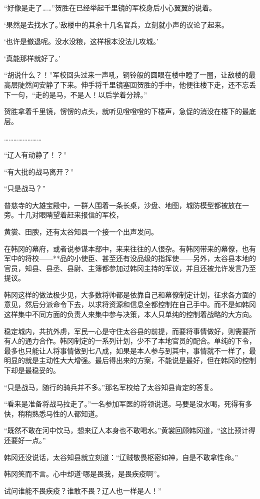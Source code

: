 “好像是走了……”贺胜在已经举起千里镜的军校身后小心翼翼的说着。

‘果然是去找水了。’敌楼中的其余十几名官兵，立刻就小声的议论了起来。

‘也许是撤退呢。没水没粮，这样根本没法儿攻城。’

‘真能那样就好了。’

“胡说什么？！”军校回头过来一声吼，铜铃般的圆眼在楼中瞪了一圈，让敌楼的最高层陡然间安静了下来。伸手将千里镜塞回贺胜的手中，他便往楼下走，还不忘丢下一句，“走的是马，不是人！以后学着分辨。”

贺胜拿着千里镜，愣愣的点头，就听见噔噔噔的下楼声，急促的消没在楼下的最底层。

……………………

“辽人有动静了！？”

“有大批的战马离开？”

“只是战马？”

普慈寺的大雄宝殿中，一群人围着一条长桌，沙盘、地图，城防模型都被放在一旁。十几对眼睛望着赶来报信的军校，

黄裳、田腴，还有太谷知县一个接一个出声发问。

在韩冈的幕府，或者说参谋本部中，来来往往的人很杂。有韩冈带来的幕僚，也有军中的将校——**品的小使臣、甚至还有没品级的指挥使——另外，太谷县本地的官员，知县、县丞、县尉、主簿都参加过韩冈主持的军议，并且还被允许发言乃至提议。

韩冈这样的做法极少见，大多数将帅都是依靠自己和幕僚制定计划，征求各方面的意见，然后分派命令下去，以求将资源和信息全都控制在自己手中。而不是如韩冈这样集中不同方面的负责人来集中参与决策，本人只单纯的控制着战略的大方向。

稳定城内，共抗外虏，军民一心是守住太谷县的前提，而要将事情做好，则需要所有人的通力合作。韩冈制定的一系列计划，少不了本地官员的配合。单纯的下令，最多也只能让人将事情做到七八成，如果是本人参与到其中，事情就不一样了，最明显的就是主动性大大增强。最后得出来的方案，不能说是最好，但在韩冈的控制下却是最稳妥的。

“只是战马，随行的骑兵并不多。”那名军校给了太谷知县肯定的答复。

“看来是准备将战马拉走了。”一名参加军医的将领说道。马要是没水喝，死得有多快，稍稍熟悉马性的人都知道。

“既然不敢在河中饮马，想来辽人本身也不敢喝水。”黄裳回顾韩冈道，“这比预计得还要好一点。”

韩冈还没说话，太谷知县就立刻道：“辽贼敬畏枢密如神，自是不敢拿性命。”

韩冈笑而不言。心中却道‘哪是畏我，是畏疾疫啊’’。

试问谁能不畏疾疫？谁敢不畏？辽人也一样是人！”

